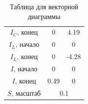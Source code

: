 \documentclass[a4paper, 12pt]{article}
\begin{document}
\begin{enumerate}
\begin{table}[htbp]
\begin{tabular}{|c|c|c|}
            $I_{C}$, конец & 0 & 4.19\\
            $I_{L}$, начало & 0 & 0\\
            $I_{L}$, конец & 0 & -4.28\\
            $I$, начало & 0 & 0\\
            $I$, конец & 0.49 & 0\\
            \hline
            $S$, масштаб & \multicolumn{2}{|c|}{0.1}\\
            \hline
        \end{tabular}
        \caption{Таблица для векторной диаграммы}
        \label{Таблица для векторной диаграммы}
    \end{table}\\
\end{enumerate}
\end{document}
